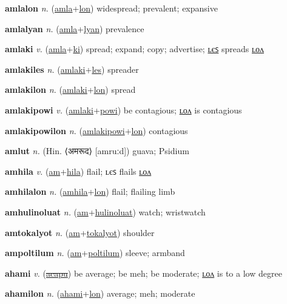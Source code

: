 \textbf{\hypertarget{amlalon}{amlalon}} \textit{n.} (\hyperlink{amla}{amla}+\allowbreak \hyperlink{lon}{lon})
widespread; prevalent; expansive

\textbf{\hypertarget{amlalyan}{amlalyan}} \textit{n.} (\hyperlink{amla}{amla}+\allowbreak \hyperlink{lyan}{lyan})
prevalence

\textbf{\hypertarget{amlaki}{amlaki}} \textit{v.} (\hyperlink{amla}{amla}+\allowbreak \hyperlink{ki}{ki})
spread; expand; copy; advertise; \hyperlink{amlakiles}{ʟєꜱ} spreads \hyperlink{amlakilon}{ʟᴏᴧ}

\textbf{\hypertarget{amlakiles}{amlakiles}} \textit{n.} (\hyperlink{amlaki}{amlaki}+\allowbreak \hyperlink{les}{les})
spreader

\textbf{\hypertarget{amlakilon}{amlakilon}} \textit{n.} (\hyperlink{amlaki}{amlaki}+\allowbreak \hyperlink{lon}{lon})
spread

\textbf{\hypertarget{amlakipowi}{amlakipowi}} \textit{v.} (\hyperlink{amlaki}{amlaki}+\allowbreak \hyperlink{powi}{powi})
be contagious; \hyperlink{amlakipowilon}{ʟᴏᴧ} is contagious

\textbf{\hypertarget{amlakipowilon}{amlakipowilon}} \textit{n.} (\hyperlink{amlakipowi}{amlakipowi}+\allowbreak \hyperlink{lon}{lon})
contagious

\textbf{\hypertarget{amlut}{amlut}} \textit{n.} (Hin. ⟨{\devanagari{}अमरूद}⟩ [amruːd])
guava; Psidium

\textbf{\hypertarget{amhila}{amhila}} \textit{v.} (\hyperlink{am}{am}+\allowbreak \hyperlink{hila}{hila})
flail; ʟєꜱ flails \hyperlink{amhilalon}{ʟᴏᴧ}

\textbf{\hypertarget{amhilalon}{amhilalon}} \textit{n.} (\hyperlink{amhila}{amhila}+\allowbreak \hyperlink{lon}{lon})
flail; flailing limb

\textbf{\hypertarget{amhulinoluat}{amhulinoluat}} \textit{n.} (\hyperlink{am}{am}+\allowbreak \hyperlink{hulinoluat}{hulinoluat})
watch; wristwatch

\textbf{\hypertarget{amtokalyot}{amtokalyot}} \textit{n.} (\hyperlink{am}{am}+\allowbreak \hyperlink{tokalyot}{tokalyot})
shoulder

\textbf{\hypertarget{ampoltilum}{ampoltilum}} \textit{n.} (\hyperlink{am}{am}+\allowbreak \hyperlink{poltilum}{poltilum})
sleeve; armband

\textbf{\hypertarget{ahami}{ahami}} \textit{v.} (\hyperlink{acapu}{\sout{acapu}})
be average; be meh; be moderate; \hyperlink{ahamilon}{ʟᴏᴧ} is to a low degree

\textbf{\hypertarget{ahamilon}{ahamilon}} \textit{n.} (\hyperlink{ahami}{ahami}+\allowbreak \hyperlink{lon}{lon})
average; meh; moderate

